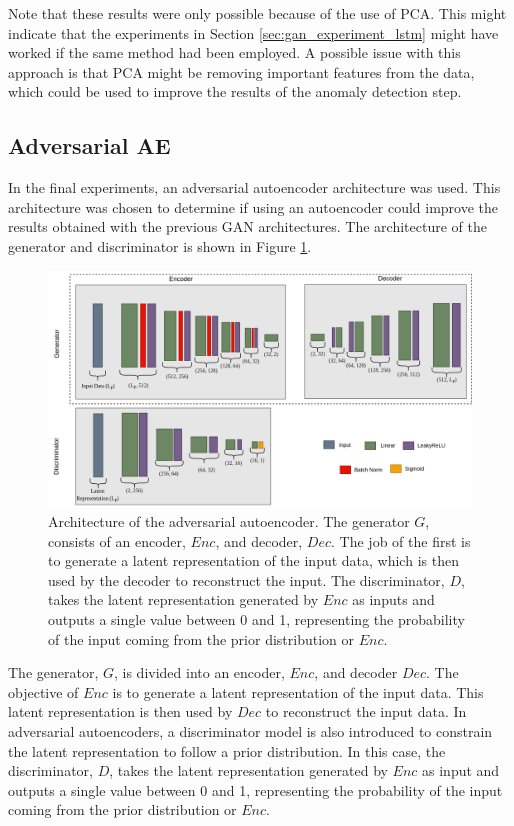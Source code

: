Note that these results were only possible because of the use of PCA. This might indicate that the experiments in Section \ref{sec:gan_experiment_lstm} might have worked if the same method had been employed. A possible issue with this approach is that PCA might be removing important features from the data, which could be used to improve the results of the anomaly detection step.

\clearpage
\subsection{Adversarial AE}\label{sec:aae}
In the final experiments, an adversarial autoencoder architecture was used. This architecture was chosen to determine if using an autoencoder could improve the results obtained with the previous GAN architectures. The architecture of the generator and discriminator is shown in Figure \ref{fig:aae_architecture}. 

\begin{figure}[h]
    \centering
    \includegraphics[width=\textwidth]{figures/aae_arch.png}
    \caption[Adversarial Autoencoder Architecture]{Architecture of the adversarial autoencoder. The generator $G$, consists of an encoder, $Enc$, and decoder, $Dec$. The job of the first is to generate a latent representation of the input data, which is then used by the decoder to reconstruct the input. The discriminator, $D$, takes the latent representation generated by $Enc$ as inputs and outputs a single value between 0 and 1, representing the probability of the input coming from the prior distribution or $Enc$.}
    \label{fig:aae_architecture}
\end{figure}

The generator, $G$, is divided into an encoder, $Enc$, and decoder $Dec$. The objective of $Enc$ is to generate a latent representation of the input data. This latent representation is then used by $Dec$ to reconstruct the input data. In adversarial autoencoders, a discriminator model is also introduced to constrain the latent representation to follow a prior distribution. In this case, the discriminator, $D$, takes the latent representation generated by $Enc$ as input and outputs a single value between 0 and 1, representing the probability of the input coming from the prior distribution or $Enc$.

